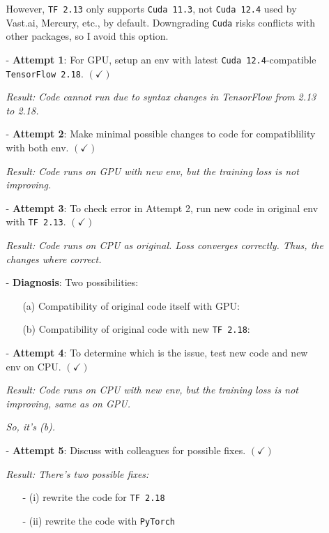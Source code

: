 \documentclass[10pt]{article}
\begin{document}
\begin{enumerate}
\begin{enumerate}
        However, \texttt{TF 2.13} only supports \texttt{Cuda 11.3}, not \texttt{Cuda 12.4} used by Vast.ai, Mercury, etc., by default.
        Downgrading \texttt{Cuda} risks conflicts with other packages, so I avoid this option.
        \item[-] \textbf{Attempt 1}: For GPU, setup an env with latest \texttt{Cuda 12.4}-compatible \texttt{TensorFlow 2.18}. $(\checkmark)$
        \item[] \emph{Result: Code cannot run due to syntax changes in TensorFlow from 2.13 to 2.18.}
        \item[-] \textbf{Attempt 2}: Make minimal possible changes to code for compatiblility with both env. $(\checkmark)$
        \item[] \emph{Result: Code runs on GPU with new env, but the training loss is not improving.}
        \item[-] \textbf{Attempt 3}: To check error in Attempt 2, run new code in original env with \texttt{TF 2.13}. $(\checkmark)$
        \item[] \emph{Result: Code runs on CPU as original. Loss converges correctly. Thus, the changes where correct.}
        \item[-] \textbf{Diagnosis}: Two possibilities:
            \begin{itemize}
                \item[(a)] Compatibility of original code itself with GPU: 
                \item[(b)] Compatibility of original code with new \texttt{TF 2.18}: 
            \end{itemize}
            \item[-] \textbf{Attempt 4}: To determine which is the issue, test new code and new env on CPU. $(\checkmark)$
            \item[] \emph{Result: Code runs on CPU with new env, but the training loss is not improving, same as on GPU.}
            \item[] \emph{So, it's (b).}
            \item[-] \textbf{Attempt 5}: Discuss with colleagues for possible fixes. $(\checkmark)$
        \item[] \emph{Result: There's two possible fixes:}
            \begin{itemize}
                \item[-] (i) rewrite the code for \texttt{TF 2.18}
                \item[-] (ii) rewrite the code with \texttt{PyTorch}
            \end{itemize}

\end{enumerate}
\end{enumerate}
\end{document}
